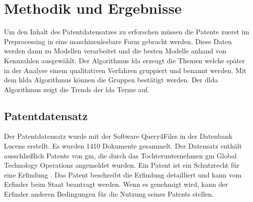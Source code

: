 \chapter{Methodik und Ergebnisse}

Um den Inhalt des Patentdatensatzes zu erforschen müssen die Patente zuerst im Preprocessing in eine maschinenlesbare Form gebracht werden. Diese Daten werden dann zu Modellen verarbeitet und die besten Modelle anhand von Kennzahlen ausgewählt. Der Algorithmus \gls{lda} erzeugt die Themen welche später in der Analyse einem qualitativen Verfahren gruppiert und benannt werden. Mit dem \gls{hlda} Algorithmus können die Gruppen bestätigt werden. Der \gls{dlda} Algorithmus zeigt die Trends der \gls{lda} Terme auf.

\section{Patentdatensatz}
Der Patentdatensatz wurde mit der Software Query4Files in der Datenbank Lucene erstellt. Es wurden 1410 Dokumente gesammelt. Der Datensatz enthält ausschließlich Patente von \gls{gm}, die durch das Tochterunternehmen \gls{gm} Global Technology Operations angemeldet wurden. Ein Patent ist ein Schutzrecht für eine Erfindung \parencite[vgl.][S. 17]{world2004wipo}. Das Patent beschreibt die Erfindung detailliert und kann vom Erfinder beim Staat beantragt werden. Wenn es genehmigt wird, kann der Erfinder anderen Bedingungen für die Nutzung seines Patents stellen.


